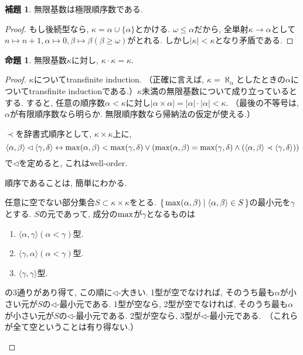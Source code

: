 \documentclass[a4paper, twoside]{bxjsarticle}
\newcommand{\abs}[1]{\left\lvert#1\right\rvert}
\theoremstyle{definition}
\newtheorem{prop}[thm]{命題}
\newtheorem{lem}[thm]{補題}
\begin{document}
        \begin{lem}
            無限基数は極限順序数である.
        \end{lem}
        \begin{proof}
            もし後続型なら, $\kappa=\alpha\cup\{\alpha\}$とかける. $\omega\leq\alpha$だから, 全単射$\kappa\to\alpha$として$n\mapsto n+1, \alpha\mapsto 0, \beta\mapsto\beta(\beta\geq\omega)$がとれる. しかし$\abs{\kappa}<\kappa$となり矛盾である.
        \end{proof}
        \begin{prop}
            無限基数$\kappa$に対し, $\kappa\cdot\kappa=\kappa$.
        \end{prop}
        \begin{proof}
            $\kappa$についてtransfinite induction. （正確に言えば, $\kappa=\aleph_\alpha$としたときの$\alpha$についてtransfinite inductionである.）$\kappa$未満の無限基数について成り立っているとする. すると, 任意の順序数$\alpha<\kappa$に対し$\abs{\alpha\times\alpha}=\abs{\alpha}\cdot\abs{\alpha}<\kappa$. （最後の不等号は, $\alpha$が有限順序数なら明らか. 無限順序数なら帰納法の仮定が使える.）
            
            $\prec$を辞書式順序として, $\kappa\times\kappa$上に, \[\langle \alpha, \beta\rangle\lhd\langle \gamma, \delta\rangle \leftrightarrow {\rm max}(\alpha, \beta)<{\rm max}(\gamma, \delta) \lor ({\rm max}(\alpha, \beta)={\rm max}(\gamma, \delta)\land(\langle \alpha, \beta\rangle\prec\langle \gamma, \delta\rangle))\]で$\lhd$を定めると, これはwell-order.
            \begin{framed}
                順序であることは, 簡単にわかる.
            
                任意に空でない部分集合$S\subset \kappa\times\kappa$をとる. $\set{{\rm max}(\alpha, \beta)|\langle \alpha, \beta\rangle\in S}$の最小元を$\gamma$とする. $S$の元であって, 成分の${\rm max}$が$\gamma$となるものは
                \begin{enumerate}
                    \item $\langle \alpha, \gamma\rangle(\alpha<\gamma)$型.
                    \item $\langle \gamma, \alpha\rangle(\alpha<\gamma)$型.
                    \item $\langle \gamma, \gamma\rangle$型.
                \end{enumerate}
                の3通りがあり得て, この順に$\lhd$-大きい. 1型が空でなければ, そのうち最も$\alpha$が小さい元が$S$の$\lhd$-最小元である. 1型が空なら, 2型が空でなければ, そのうち最も$\alpha$が小さい元が$S$の$\lhd$-最小元である. 2型が空なら, 3型が$\lhd$-最小元である.　（これらが全て空ということは有り得ない.）
                

\end{framed}
\end{proof}
\end{document}
